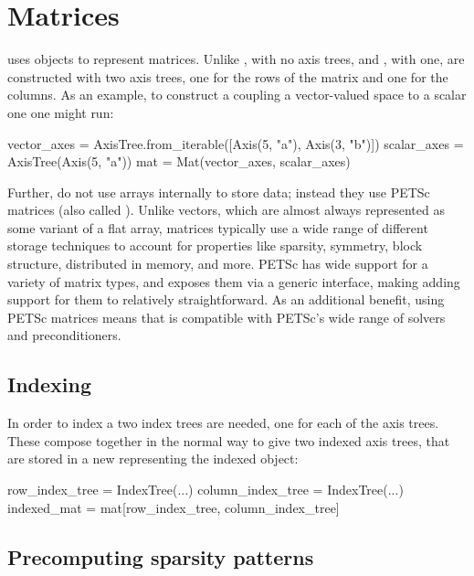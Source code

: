 \documentclass[thesis]{subfiles}
\begin{document}
\section{Matrices}
\label{sec:impl_matrices}

 uses  objects to represent matrices.
Unlike , with no axis trees, and , with one,  are constructed with two axis trees, one for the rows of the matrix and one for the columns.
As an example, to construct a  coupling a vector-valued space to a scalar one one might run:
\begin{pyinline}
  vector_axes = AxisTree.from_iterable([Axis(5, "a"), Axis(3, "b")])
  scalar_axes = AxisTree(Axis(5, "a"))
  mat = Mat(vector_axes, scalar_axes)
\end{pyinline}

Further,  do not use \numpy arrays internally to store data; instead they use PETSc matrices (also called ).
Unlike vectors, which are almost always represented as some variant of a flat array, matrices typically use a wide range of different storage techniques to account for properties like sparsity, symmetry, block structure, distributed in memory, and more.
PETSc has wide support for a variety of matrix types, and exposes them via a generic interface, making adding support for them to  relatively straightforward.
As an additional benefit, using PETSc matrices means that  is compatible with PETSc's wide range of solvers and preconditioners.

\subsection{Indexing}

In order to index a  two index trees are needed, one for each of the axis trees.
These compose together in the normal way to give two indexed axis trees, that are stored in a new  representing the indexed object:
\begin{pyinline}
  row_index_tree = IndexTree(...)
  column_index_tree = IndexTree(...)
  indexed_mat = mat[row_index_tree, column_index_tree]
\end{pyinline}

\subsection{Precomputing sparsity patterns}
\end{document}
